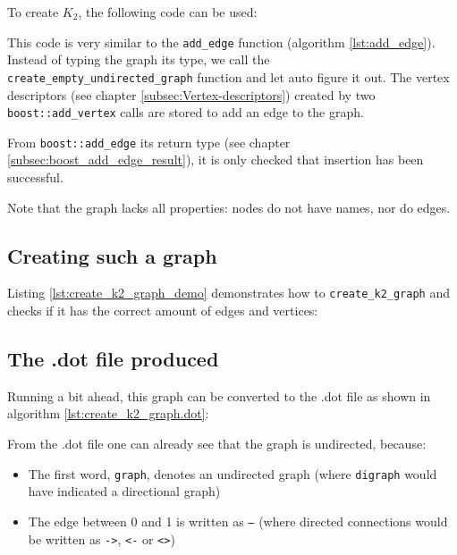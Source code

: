 To create $K_{2}$, the following code can be used:



This code is very similar to 
the \verb;add_edge; function (algorithm \ref{lst:add_edge}).
Instead of typing the graph its type, 
we call the \verb;create_empty_undirected_graph; 
function and let auto figure it out.
The vertex descriptors 
(see chapter \ref{subsec:Vertex-descriptors}) 
created by two \verb;boost::add_vertex; 
calls are stored to add an edge to the graph.

From \verb;boost::add_edge; 
its return type 
(see chapter \ref{subsec:boost_add_edge_result}), 
it is only checked that insertion has been successful.

Note that the graph lacks all properties: nodes do not have names, nor do
edges.

\subsection{Creating such a graph}

Listing \ref{lst:create_k2_graph_demo}
demonstrates how to \verb;create_k2_graph; and checks if it has the correct
amount of edges and vertices:



\subsection{The .dot file produced}
\label{subsec:create_k2_dot}

Running a bit ahead, this graph can be converted to the .dot file as shown
in algorithm \ref{lst:create_k2_graph.dot}:

%
%
%

From the .dot file one can already see that the graph is undirected, because:

\begin{itemize}
  \item The first word, \verb;graph;, denotes an undirected graph 
    (where \verb;digraph; would have indicated a directional graph)
  \item The edge between 0 and 1 is written as \verb;–; 
    (where directed connections would be written as \verb;->;, 
    \verb;<-; or \verb;<>;)
\end{itemize}

